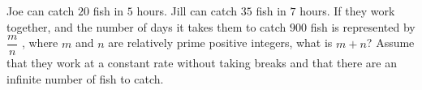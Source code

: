 Joe can catch $20$ fish in $5$ hours. Jill can catch $35$ fish in $7$ hours. If they work together, and the number of days it takes them to catch $900$ fish is represented by $\dfrac{m}{n}$ , where $m$ and $n$ are relatively prime positive integers, what is $m + n$? Assume that they work at a constant rate without taking breaks and that there are an infinite number of fish to catch.
